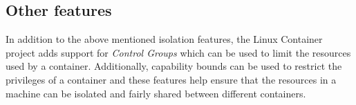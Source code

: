\subsection{Other features}
In addition to the above mentioned isolation features, the Linux Container project adds support for \emph{Control Groups} which can be used to limit the resources used by a container. Additionally, capability bounds can be used to restrict the privileges of a container and these features help ensure that the resources in a machine can be isolated and fairly shared between different containers.
